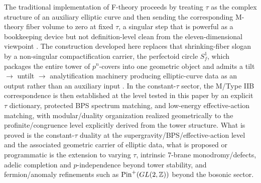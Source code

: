 \documentclass[11pt]{article}
\theoremstyle{remark}
\newcommand{\Z}{\mathbb{Z}}
\begin{document}
The traditional implementation of F-theory proceeds by treating \(\tau\) as the complex structure of an auxiliary elliptic curve and then sending the corresponding M-theory fiber volume to zero at fixed \(\tau\), a singular step that is powerful as a bookkeeping device but not definition-level clean from the eleven-dimensional viewpoint \cite{Vafa1996, Schwarz1995}. The construction developed here replaces that shrinking-fiber slogan by a non-singular compactification carrier, the perfectoid circle \(S_f^{1}\), which packages the entire tower of \(p^{n}\)-covers into one geometric object and admits a tilt \(\to\) untilt \(\to\) analytification machinery producing elliptic-curve data as an output rather than an auxiliary input \cite{Scholze2012, ClausenScholze}. In the constant-\(\tau\) sector, the M/Type IIB correspondence is then established at the level tested in this paper by an explicit \(\tau\) dictionary, protected BPS spectrum matching, and low-energy effective-action matching, with modular/duality organization realized geometrically to the profinite/congruence level explicitly derived from the tower structure. What is proved is the constant-\(\tau\) duality at the supergravity/BPS/effective-action level and the associated geometric carrier of elliptic data, what is proposed or programmatic is the extension to varying \(\tau\), intrinsic 7-brane monodromy/defects, adelic completion and \(p\)-independence beyond tower stability, and fermion/anomaly refinements such as \({\rm Pin}^{+}(GL(2,\Z))\) beyond the bosonic sector.
\end{document}
